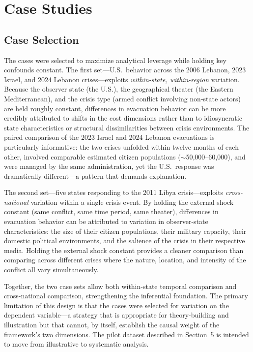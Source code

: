 \documentclass[12pt]{article}
\begin{document}
\section{Case Studies}

\subsection{Case Selection}

The cases were selected to maximize analytical leverage while holding key confounds constant. The first set---U.S.\ behavior across the 2006 Lebanon, 2023 Israel, and 2024 Lebanon crises---exploits \emph{within-state, within-region} variation. Because the observer state (the U.S.), the geographical theater (the Eastern Mediterranean), and the crisis type (armed conflict involving non-state actors) are held roughly constant, differences in evacuation behavior can be more credibly attributed to shifts in the cost dimensions rather than to idiosyncratic state characteristics or structural dissimilarities between crisis environments. The paired comparison of the 2023 Israel and 2024 Lebanon evacuations is particularly informative: the two crises unfolded within twelve months of each other, involved comparable estimated citizen populations ($\sim$50,000--60,000), and were managed by the same administration, yet the U.S.\ response was dramatically different---a pattern that demands explanation.

The second set---five states responding to the 2011 Libya crisis---exploits \emph{cross-national} variation within a single crisis event. By holding the external shock constant (same conflict, same time period, same theater), differences in evacuation behavior can be attributed to variation in observer-state characteristics: the size of their citizen populations, their military capacity, their domestic political environments, and the salience of the crisis in their respective media. Holding the external shock constant provides a cleaner comparison than comparing across different crises where the nature, location, and intensity of the conflict all vary simultaneously.

Together, the two case sets allow both within-state temporal comparison and cross-national comparison, strengthening the inferential foundation. The primary limitation of this design is that the cases were selected for variation on the dependent variable---a strategy that is appropriate for theory-building and illustration but that cannot, by itself, establish the causal weight of the framework's two dimensions. The pilot dataset described in Section~5 is intended to move from illustrative to systematic analysis.
\end{document}
